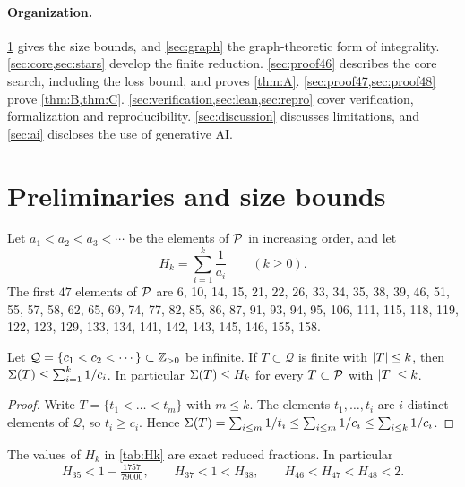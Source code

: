 \documentclass[11pt]{article}
\begin{document}
\paragraph{Organization.}
\cref{sec:prelim} gives the size bounds, and \cref{sec:graph} the graph-theoretic form of integrality.
\cref{sec:core,sec:stars} develop the finite reduction.
\cref{sec:proof46} describes the core search, including the loss bound, and proves \cref{thm:A}. \cref{sec:proof47,sec:proof48} prove \cref{thm:B,thm:C}.
\cref{sec:verification,sec:lean,sec:repro} cover verification, formalization and reproducibility.
\cref{sec:discussion} discusses limitations, and \cref{sec:ai} discloses the use of generative AI.

\section{Preliminaries and size bounds}\label{sec:prelim}

Let $a_1<a_2<a_3<\cdots$ be the elements of $\mathcal{P}$ in increasing order, and let
\[
H_k=\sum_{i=1}^{k}\frac1{a_i}\qquad(k\ge 0).
\]
The first $47$ elements of $\mathcal{P}$ are
6, 10, 14, 15, 21, 22, 26, 33, 34, 35, 38, 39, 46, 51, 55, 57, 58, 62, 65, 69, 74, 77, 82, 85, 86, 87, 91, 93, 94, 95, 106, 111, 115, 118, 119, 122, 123, 129, 133, 134, 141, 142, 143, 145, 146, 155, 158.

\begin{lemma}\label{lem:exchange}
Let $\mathcal{Q}=\{c_1<c_2<\cdots\}\subset\mathbb{Z}_{>0}$ be infinite. If $T\subset\mathcal{Q}$ is finite with $\lvert T\rvert\le k$, then $\Sigma(T)\le\sum_{i=1}^{k}1/c_i$. In particular $\Sigma(T)\le H_k$ for every $T\subset\mathcal{P}$ with $\lvert T\rvert\le k$.
\end{lemma}

\begin{proof}
Write $T=\{t_1<\dots<t_m\}$ with $m\le k$. The elements $t_1,\dots,t_i$ are $i$ distinct elements of $\mathcal{Q}$, so $t_i\ge c_i$. Hence $\Sigma(T)=\sum_{i\le m}1/t_i\le\sum_{i\le m}1/c_i\le\sum_{i\le k}1/c_i$.
\end{proof}

\begin{proposition}\label{prop:Hk}
The values of $H_k$ in \cref{tab:Hk} are exact reduced fractions. In particular
\[
H_{35}<1-\tfrac{1757}{79000},\qquad H_{37}<1<H_{38},\qquad H_{46}<H_{47}<H_{48}<2 .
\]
\end{proposition}
\end{document}
